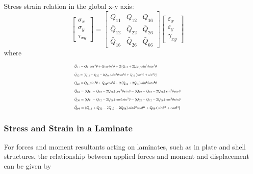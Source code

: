 Stress strain relation in the global x-y axis:
\begin{equation}
	\label{equ:stress-strain}
	\left[\begin{array}{l}
			\sigma _{x} \\ 
			\sigma _{y} \\
			\tau_{xy}
			\end{array}
	\right]=
	\left[\begin{array}{lll}
			\bar{Q}_{11} & \bar{Q}_{12} & \bar{Q}_{16}\\ 
			\bar{Q}_{12} & \bar{Q}_{22} & \bar{Q}_{26} \\
			\bar{Q}_{16} & \bar{Q}_{26} &\bar{Q}_{66}
		\end{array}
	 \right]
	 \left[\begin{array}{l}
			 \varepsilon_{x} \\ 
	 		 \varepsilon_{y} \\ 
	 		 \gamma_{x y}
	 		\end{array}
	\right] 
\end{equation}
where
\begin{equation}
	\begin{array}{l}
		\resizebox{.35\textwidth}{!}{$\bar{Q}_{11}=Q_{11} cos^{4}\theta+Q_{22} sin^{4}\theta+2\left(Q_{12}+2
			Q_{66}\right) sin^{2}\theta cos^{2}\theta$} \\
		\resizebox{.35\textwidth}{!}{$\bar{Q}_{12}=\left(Q_{11}+Q_{22}-4 Q_{66}\right) sin^{2}\theta
			cos^{2}\theta+Q_{12}\left(cos^{4}\theta+sin^{2}\theta \right)$} \\
		\resizebox{.35\textwidth}{!}{$\bar{Q}_{22}=Q_{11} sin^{4}\theta+Q_{22} cos^{4}\theta+2\left(Q_{12}+2
				Q_{66}\right) sin^{2}\theta cos^{2}\theta$} \\
		\resizebox{.45\textwidth}{!}{$\bar{Q}_{16}=\left(Q_{11}-Q_{12}-2
			Q_{66}\right) cos^{3}\theta
			sin\theta-\left(Q_{22}-Q_{12}-2Q_{66}\right) sin^{3}\theta cos\theta$} \\ 
		\resizebox{.45\textwidth}{!}{$\bar{Q}_{26}=\left(Q_{11}-Q_{12}-2
			Q_{66}\right) cos\theta sin^{3}\theta-\left(Q_{22}-Q_{12}-2
			Q_{66}\right)cos^{3}\theta sin\theta$} \\ 
		\resizebox{.45\textwidth}{!}	{$\bar{Q}_{66}=\left(Q_{11}+Q_{22}-2 Q_{12}-2 Q_{66}\right)
			sin\theta^{2}cos\theta^{2}+Q_{66}\left(sin\theta^{4}+cos\theta^{4}\right)$}\\
	\end{array}
\end{equation}


\subsubsection{Stress and Strain in a Laminate}
For forces and moment resultants acting on laminates, such as in plate and shell
structures, the relationship between applied forces and moment and displacement
can be given by

